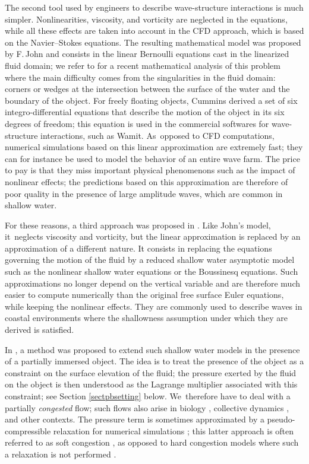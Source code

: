 \documentclass[10pt]{amsart}
\theoremstyle{definition}
\begin{document}
The second tool used by engineers to describe wave-structure interactions is much simpler.
Nonlinearities, viscosity, and vorticity are neglected in the equations,
while all these effects are taken into account in the CFD approach, which is based on the Navier--Stokes equations.
The resulting mathematical model was proposed by F.\,John \cite{John1,John2} and consists in the linear Bernoulli equations cast in the linearized fluid domain;
we refer to \cite{LannesMing} for a recent mathematical analysis of this problem where the main difficulty comes from the singularities in the fluid domain:
corners or wedges at the intersection between the surface of the water and the boundary of the object.
For freely floating objects, Cummins \cite{Cummins} derived a set of six integro-differential equations
that describe the motion of the object in its six degrees of freedom;
this equation is used in the commercial softwares for wave-structure interactions, such as Wamit. As~opposed to CFD computations, numerical simulations based on this linear approximation are extremely fast;
they can for instance be used to model the behavior of an entire wave farm.
The price to pay is that they miss important physical phenomenons such as the impact of nonlinear effects;
the predictions based on this approximation are therefore of poor quality in the presence of large amplitude waves, which are common in shallow water.

For these reasons, a third approach was proposed in \cite{Lannes2017}.
Like John's model, it~\hbox{neglects} viscosity and vorticity, but the linear approximation is replaced by an approximation of a different nature.
It consists in replacing the equations governing the motion of the fluid by a reduced shallow water asymptotic model
such as the nonlinear shallow water equations or the Boussinesq equations.
Such approximations no longer depend on the vertical variable and are therefore much easier to compute numerically than the original free surface Euler equations,
while keeping the nonlinear effects.
They are commonly used to describe waves in coastal environments where the shallowness assumption under which they are derived is satisfied.

In \cite{Lannes2017}, a method was proposed to extend such shallow water models in the presence of a partially immersed object.
The idea is to treat the presence of the object as a constraint on the surface elevation of the fluid;
the pressure exerted by the fluid on the object is then understood as the Lagrange multiplier associated with this constraint;
see Section \ref{sectpbsetting} below. We~therefore have to deal with a partially {\it congested} flow;
such flows also arise in biology \cite{PQV}, collective dynamics \cite{DHN,MRSV}, and other contexts.
The pressure term is sometimes approximated by a pseudo-compressible relaxation for numerical simulations \cite{GPSW1,GPSW2};
this latter approach is often referred to as soft congestion \cite{Perrin},
as opposed to hard congestion models where such a relaxation is not performed \cite{ABP,DalibardPerrin1,DalibardPerrin2}.
\end{document}

